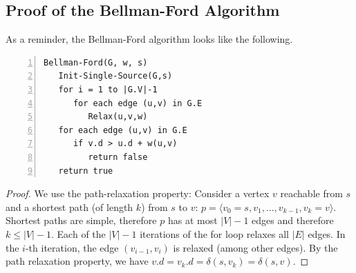 
\subsection{Proof of the Bellman-Ford Algorithm}

As a reminder, the Bellman-Ford algorithm looks like the following.

\begin{Verbatim}[numbers=left, xleftmargin=5mm]
Bellman-Ford(G, w, s)
   Init-Single-Source(G,s)
   for i = 1 to |G.V|-1
      for each edge (u,v) in G.E
         Relax(u,v,w)
   for each edge (u,v) in G.E
      if v.d > u.d + w(u,v)
         return false
   return true
\end{Verbatim}



\begin{proof} We use the path-relaxation property: Consider a vertex $v$ reachable from $s$ and a shortest path (of length $k$) from $s$ to $v$: $p = \langle v_0 = s, v_1, \ldots, v_{k-1}, v_k = v \rangle$. Shortest paths are simple, therefore $p$ has at most $|V|-1$ edges and therefore $k \leq |V| -1$.  Each of the $|V|-1$ iterations of the for loop relaxes all $|E|$ edges. In the $i$-th iteration, the edge $(v_{i-1},v_i)$ is relaxed (among other edges). By the path relaxation property, we have $v.d = v_k.d = \delta(s, v_k) = \delta(s,v)$.
\end{proof}



